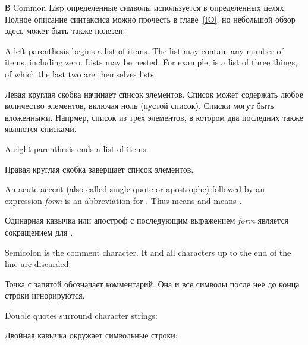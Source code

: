 В Common Lisp определенные символы используется в определенных целях. Полное
описание синтаксиса можно прочесть в главе~\ref{IO}, но небольшой обзор здесь
может быть также полезен:
\begin{indentdesc}{1.2pc}
\item[\cd{(}]
A left parenthesis begins a list of items.  The list may
contain any number of items, including zero.  Lists may be nested.
For example,  is a list of three things,
of which the last two are themselves lists.

\item[\cd{(}]
Левая круглая скобка начинает список элементов. Список может содержать любое
количество элементов, включая ноль (пустой список). Списки могут быть
вложенными. Напрмер,  список из трех элементов, в
котором два последних также являются списками.

\item[\cd{)}] A right parenthesis ends a list of items.

\item[\cd{)}] Правая круглая скобка завершает список элементов.

\item[\cd{\Xquote}] An acute accent (also called single
quote or apostrophe) followed by an expression {\it form}
is an abbreviation for .  Thus  means
 and  means .

\item[\cd{\Xquote}] Одинарная кавычка или апостроф с последующим выражением {\it
form} является сокращением для . 

\item[\cd{;}] Semicolon is the comment character.  It and all
characters up to the end of the line are discarded.

\item[\cd{;}] Точка с запятой обозначает комментарий. Она и все символы после
нее до конца строки игнорируются.

\item[\cd{"}] Double quotes surround character strings: \\

\item[\cd{"}] Двойная кавычка окружает символьные строки: \\


\end{indentdesc}
